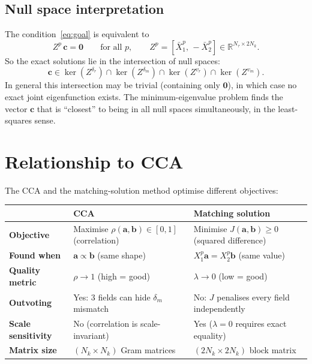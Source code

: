 \documentclass[a4paper,11pt]{article}
\newcommand{\va}{\bm{a}}
\newcommand{\vb}{\bm{b}}
\newcommand{\vc}{\bm{c}}
\newcommand{\Xb}[2]{X_{#1}^{#2}}
\newcommand{\Xn}[2]{\bar{X}_{#1}^{#2}}
\newcommand{\Nk}{N_k}
\newcommand{\Nt}{N_\tau}
\theoremstyle{plain}
\begin{document}
\subsection{Null space interpretation}
\label{sec:null}

The condition~\eqref{eq:goal} is equivalent to
\begin{equation}
    Z^p\,\vc = \bm{0} \qquad \text{for all } p,
    \qquad Z^p = [\Xn{1}{p},\,-\Xn{2}{p}] \in \mathbb{R}^{\Nt\times 2\Nk}.
    \label{eq:null}
\end{equation}
So the exact solutions lie in the intersection of null spaces:
\begin{equation}
    \vc \in \ker(Z^{\delta_r}) \cap \ker(Z^{\delta_m})
           \cap \ker(Z^{v_r}) \cap \ker(Z^{v_m}).
    \label{eq:intersection}
\end{equation}
In general this intersection may be trivial (containing only $\bm{0}$), in which
case no exact joint eigenfunction exists.
The minimum-eigenvalue problem finds the vector $\vc$ that is ``closest'' to
being in all null spaces simultaneously, in the least-squares sense.

\section{Relationship to CCA}
\label{sec:relation}

The CCA and the matching-solution method optimise different objectives:

\begin{center}
\begin{tabular}{lll}
\toprule
 & CCA & Matching solution \\
\midrule
\textbf{Objective} & Maximise $\rho(\va,\vb) \in [0,1]$ (correlation)
                   & Minimise $J(\va,\vb) \geq 0$ (squared difference) \\
\textbf{Found when} & $\va \propto \vb$ (same shape)
                    & $\Xb{1}{p}\va = \Xb{2}{p}\vb$ (same value) \\
\textbf{Quality metric} & $\rho \to 1$ (high = good)
                        & $\lambda \to 0$ (low = good) \\
\textbf{Outvoting} & Yes: 3 fields can hide $\delta_m$ mismatch
                   & No: $J$ penalises every field independently \\
\textbf{Scale sensitivity} & No (correlation is scale-invariant)
                            & Yes ($\lambda = 0$ requires exact equality) \\
\textbf{Matrix size} & $(\Nk\times\Nk)$ Gram matrices
                     & $(2\Nk\times 2\Nk)$ block matrix \\
\bottomrule
\end{tabular}
\end{center}
\end{document}
